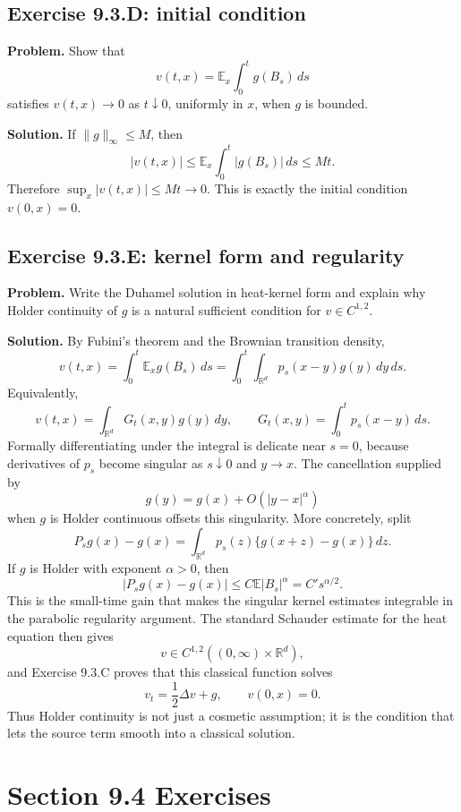 \documentclass[11pt]{article}
\newcommand{\R}{\mathbb{R}}
\newcommand{\E}{\mathbb{E}}
\newcommand{\dd}{\,d}
\newcommand{\Del}{\Delta}
\begin{document}
\subsection*{Exercise 9.3.D: initial condition}

\noindent\textbf{Problem.}
Show that
\[
  v(t,x)=\E_x\int_0^t g(B_s)\dd s
\]
satisfies $v(t,x)\to0$ as $t\downarrow0$, uniformly in $x$, when
$g$ is bounded.

\noindent\textbf{Solution.}
If $\|g\|_\infty\le M$, then
\[
  |v(t,x)|
  \le
  \E_x\int_0^t |g(B_s)|\dd s
  \le Mt.
\]
Therefore $\sup_x |v(t,x)|\le Mt\to0$.  This is exactly the initial
condition $v(0,x)=0$.

\subsection*{Exercise 9.3.E: kernel form and regularity}

\noindent\textbf{Problem.}
Write the Duhamel solution in heat-kernel form and explain why
Holder continuity of $g$ is a natural sufficient condition for
$v\in C^{1,2}$.

\noindent\textbf{Solution.}
By Fubini's theorem and the Brownian transition density,
\[
  v(t,x)
  =
  \int_0^t \E_x g(B_s)\dd s
  =
  \int_0^t\int_{\R^d}p_s(x-y)g(y)\dd y\dd s.
\]
Equivalently,
\[
  v(t,x)=\int_{\R^d}G_t(x,y)g(y)\dd y,
  \qquad
  G_t(x,y)=\int_0^t p_s(x-y)\dd s.
\]
Formally differentiating under the integral is delicate near $s=0$,
because derivatives of $p_s$ become singular as $s\downarrow0$ and
$y\to x$.  The cancellation supplied by
\[
  g(y)=g(x)+O(|y-x|^\alpha)
\]
when $g$ is Holder continuous offsets this singularity.  More
concretely, split
\[
  P_sg(x)-g(x)
  =
  \int_{\R^d}p_s(z)\{g(x+z)-g(x)\}\dd z.
\]
If $g$ is Holder with exponent $\alpha>0$, then
\[
  |P_sg(x)-g(x)|
  \le
  C\E|B_s|^\alpha
  =
  C' s^{\alpha/2}.
\]
This is the small-time gain that makes the singular kernel estimates
integrable in the parabolic regularity argument.  The standard
Schauder estimate for the heat equation then gives
\[
  v\in C^{1,2}((0,\infty)\times\R^d),
\]
and Exercise 9.3.C proves that this classical function solves
\[
  v_t=\frac12\Del v+g,\qquad v(0,x)=0.
\]
Thus Holder continuity is not just a cosmetic assumption; it is the
condition that lets the source term smooth into a classical solution.

\section*{Section 9.4 Exercises}
\end{document}
